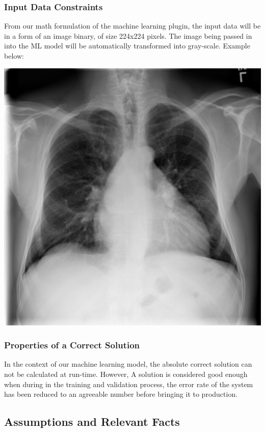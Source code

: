 \documentclass[12pt]{article}
\begin{document}
\subsubsection{Input Data Constraints} \label{sec_DataConstraints} 
From our math formulation of the machine learning plugin, the input data will be in a form of an image binary, of size 224x224 pixels. The image being passed in into the ML model will be automatically transformed into gray-scale. Example below:
\begin{center}
    \includegraphics[scale=0.3]{chest-x-ray.png}
\end{center}

\subsubsection{Properties of a Correct Solution} \label{sec_CorrectSolution}
In the context of our machine learning model, the absolute correct solution can not be calculated at run-time. However, A solution is considered good enough when during in the training and validation process, the error rate of the system has been reduced to an agreeable number before bringing it to production.
\newpage
\subsection{Assumptions and Relevant Facts}
\end{document}
